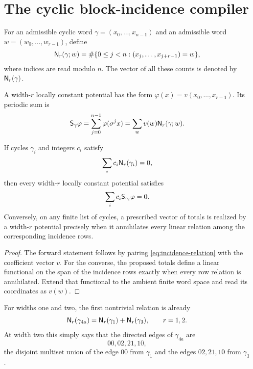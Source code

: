 \section{The cyclic block-incidence compiler}

\begin{definition}
For an admissible cyclic word \(\gamma=(x_0,\ldots,x_{n-1})\) and an
admissible word \(w=(w_0,\ldots,w_{r-1})\), define
\begin{equation}\label{eq:block-count}
 \mathsf N_r(\gamma;w)
 =\#\{0\leq j<n:(x_j,\ldots,x_{j+r-1})=w\},
\end{equation}
where indices are read modulo \(n\).  The vector of all these counts is
denoted by \(\mathsf N_r(\gamma)\).
\end{definition}

A width-\(r\) locally constant potential has the form
\(\varphi(x)=v(x_0,\ldots,x_{r-1})\).  Its periodic sum is
\begin{equation}\label{eq:pairing}
 \mathsf S_\gamma\varphi
 =\sum_{j=0}^{n-1}\varphi(\sigma^j x)
 =\sum_w v(w)\mathsf N_r(\gamma;w).
\end{equation}

\begin{lemma}\label{lem:incidence}
If cycles \(\gamma_i\) and integers \(c_i\) satisfy
\begin{equation}\label{eq:incidence-relation}
 \sum_i c_i\mathsf N_r(\gamma_i)=0,
\end{equation}
then every width-\(r\) locally constant potential satisfies
\begin{equation}\label{eq:sum-relation}
 \sum_i c_i\mathsf S_{\gamma_i}\varphi=0.
\end{equation}
Conversely, on any finite list of cycles, a prescribed vector of totals is
realized by a width-\(r\) potential precisely when it annihilates every linear
relation among the corresponding incidence rows.
\end{lemma}

\begin{proof}
The forward statement follows by pairing \eqref{eq:incidence-relation} with
the coefficient vector \(v\).  For the converse, the proposed totals define
a linear functional on the span of the incidence rows exactly when every
row relation is annihilated.  Extend that functional to the ambient finite
word space and read its coordinates as \(v(w)\).
\end{proof}

For widths one and two, the first nontrivial relation is already
\begin{equation}\label{eq:edge-relation}
 \mathsf N_r(\gamma_{4a})
 =\mathsf N_r(\gamma_1)+\mathsf N_r(\gamma_3),
 \qquad r=1,2.
\end{equation}
At width two this simply says that the directed edges of \(\gamma_{4a}\) are
\[
 00,02,21,10,
\]
the disjoint multiset union of the edge \(00\) from \(\gamma_1\) and the
edges \(02,21,10\) from \(\gamma_3\).

